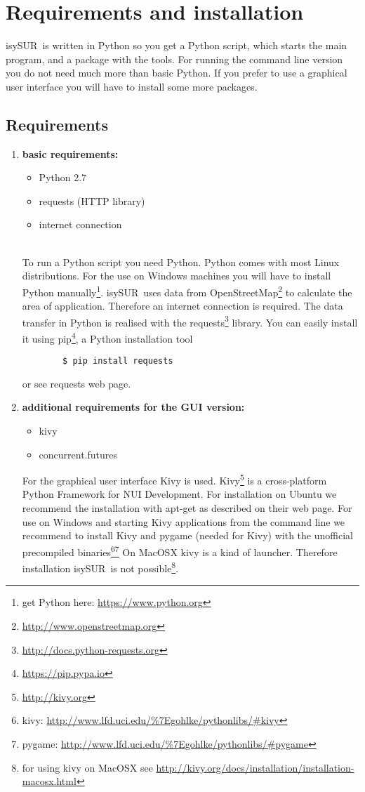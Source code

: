 \documentclass[11pt,fleqn]{book} %
\newcommand{\ProjectTitle}{isySUR}
\newcommand{\pt}{\ProjectTitle}
\begin{document}
\section{Requirements and installation}\label{sec:installation}
\pt\ is written in Python so you get a Python script, which starts the main program, and a package with the tools. For running the command line version you do not need much more than basic Python. If you prefer to use a graphical user interface you will have to install some more packages.
\subsection{Requirements}\label{sec:requirements}
\begin{enumerate}
	\item \textbf{basic requirements:}
	\begin{itemize}
		\item Python 2.7
		\item requests (HTTP library)
		\item internet connection
	\end{itemize}
	~\\
	To run a Python script you need Python. Python comes with most Linux distributions. For the use on Windows machines you will have to install Python manually\footnote{get Python here: \url{https://www.python.org}}. \pt\ uses data from OpenStreetMap\footnote{\url{http://www.openstreetmap.org}} to calculate the area of application. Therefore an internet connection is required. The data transfer in Python is realised with the requests\footnote{\url{http://docs.python-requests.org}\label{fn:requests}} library. You can easily install it using pip\footnote{\url{https://pip.pypa.io}}, a Python installation tool
	\begin{verbatim}
		$ pip install requests
	\end{verbatim}
	or see requests web page.
	\newpage
	\item \textbf{additional requirements for the GUI version:}
	\begin{itemize}
		\item kivy
		\item concurrent.futures
	\end{itemize}
	For the graphical user interface Kivy is used. Kivy\footnote{\url{http://kivy.org}} is a cross-platform Python Framework for NUI Development. For installation on Ubuntu we recommend the installation with apt-get as described on their web page. For use on Windows and starting Kivy applications from the command line we recommend to install Kivy and pygame (needed for Kivy) with the unofficial precompiled binaries\footnote{kivy: \url{http://www.lfd.uci.edu/\%7Egohlke/pythonlibs/\#kivy}}\footnote{pygame: \url{http://www.lfd.uci.edu/\%7Egohlke/pythonlibs/\#pygame}} On MacOSX kivy is a kind of launcher. Therefore installation \pt\ is not possible\footnote{for using kivy on MacOSX see \url{http://kivy.org/docs/installation/installation-macosx.html}}. %
	

\end{enumerate}
\end{document}
